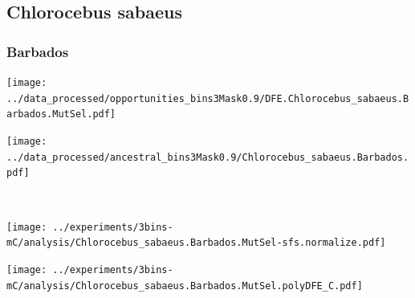 \subsection{Chlorocebus sabaeus}

\subsubsection{Barbados}

\begin{minipage}{0.49\linewidth}
    \texttt{[image: ../data\_processed/opportunities\_bins3Mask0.9/DFE.Chlorocebus\_sabaeus.Barbados.MutSel.pdf]}
\end{minipage}
\begin{minipage}{0.49\linewidth}
    \texttt{[image: ../data\_processed/ancestral\_bins3Mask0.9/Chlorocebus\_sabaeus.Barbados.pdf]}
\end{minipage}
\\
\begin{minipage}{0.49\linewidth}
    \texttt{[image: ../experiments/3bins-mC/analysis/Chlorocebus\_sabaeus.Barbados.MutSel-sfs.normalize.pdf]}
\end{minipage}
\begin{minipage}{0.4\linewidth}
    \texttt{[image: ../experiments/3bins-mC/analysis/Chlorocebus\_sabaeus.Barbados.MutSel.polyDFE\_C.pdf]}
\end{minipage}
